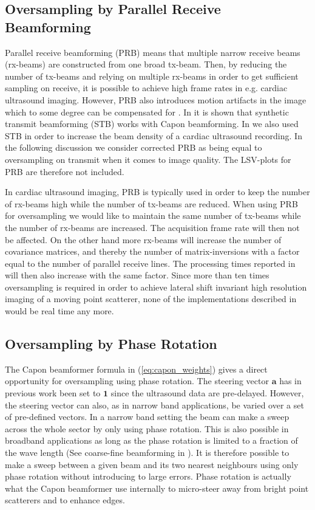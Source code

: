 \documentclass[journal]{IEEEtran}
\renewcommand{\vec}[1]{\mathbf{#1}}
\begin{document}
\subsection{Oversampling by Parallel Receive Beamforming}
Parallel receive beamforming (PRB) means that multiple narrow receive beams (rx-beams) are constructed from one broad tx-beam. Then, by reducing the number of tx-beams and relying on multiple rx-beams in order to get sufficient sampling on receive, it is possible to achieve high frame rates in e.g. cardiac ultrasound imaging. However, PRB also introduces motion artifacts in the image which to some degree can be compensated for \cite{Hergum2007, Denarie2011, Denarie2013}. In \cite{Rabinovich2013} it is shown that synthetic transmit beamforming (STB) \cite{Hergum2007} works with Capon beamforming. In \cite{Asen} we also used STB in order to increase the beam density of a cardiac ultrasound recording. In the following discussion we consider corrected PRB as being equal to oversampling on transmit when it comes to image quality. The LSV-plots for PRB are therefore not included.

In cardiac ultrasound imaging, PRB is typically used in order to keep the number of rx-beams high while the number of tx-beams are reduced. When using PRB for oversampling we would like to maintain the same number of tx-beams while the number of rx-beams are increased. The acquisition frame rate will then not be affected. On the other hand more rx-beams will increase the number of covariance matrices, and thereby the number of matrix-inversions with a factor equal to the number of parallel receive lines. The processing times reported in \cite{Asen} will then also increase with the same factor. Since more than ten times oversampling is required in order to achieve lateral shift invariant high resolution imaging of a moving point scatterer, none of the implementations described in \cite{Asen} would be real time any more.

\subsection{Oversampling by Phase Rotation}
The Capon beamformer formula in (\ref{eq:capon_weights}) gives a direct opportunity for oversampling using phase rotation. The steering vector $\vec{a}$ has in previous work been set to $\vec{1}$ since the ultrasound data are pre-delayed. However, the steering vector can also, as in narrow band applications, be varied over a set of pre-defined vectors. In a narrow band setting the beam can make a sweep across the whole sector by only using phase rotation. This is also possible in broadband applications as long as the phase rotation is limited to a fraction of the wave length (See coarse-fine beamforming in \cite{Thomenius}). It is therefore possible to make a sweep between a given beam and its two nearest neighbours using only phase rotation without introducing to large errors. Phase rotation is actually what the Capon beamformer use internally to micro-steer away from bright point scatterers and to enhance edges.
\end{document}
